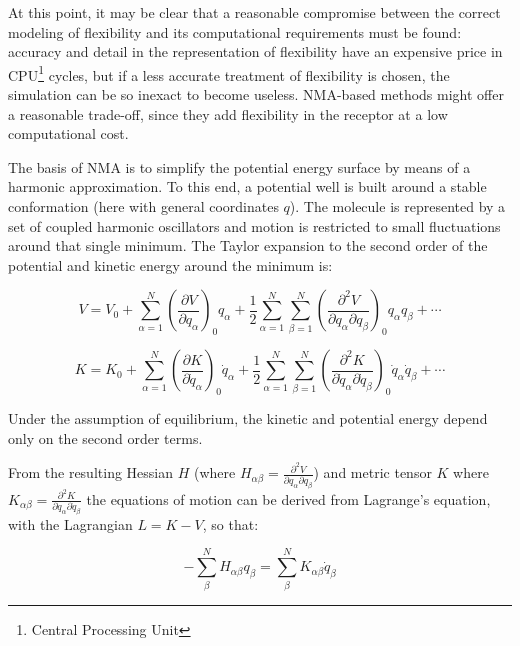 At this point, it may be clear that a reasonable compromise between the correct modeling of flexibility and its computational requirements must be found: accuracy and detail in the representation of flexibility have an expensive price in CPU\footnote{Central Processing Unit} cycles, but if a less accurate treatment of flexibility is chosen, the simulation can be so inexact to become useless. NMA-based methods might offer a reasonable trade-off, since they add flexibility in the receptor at a low computational cost. 

The basis of NMA \cite{goldstein_classical_1950} is to simplify the potential energy surface by means of a harmonic approximation. To this end, a potential well is built around a stable conformation (here with general coordinates $q$). The molecule is represented by a set of coupled harmonic oscillators and motion is restricted to small fluctuations around that single minimum. The Taylor expansion to the second order of the potential and kinetic energy around the minimum is:

\begin{equation}
V = V_0 + \sum^N_{\alpha=1}\left (  \frac{\partial V}{\partial q_\alpha} \right )_0 q_\alpha + \frac{1}{2} \sum^N_{\alpha=1} \sum^N_{\beta=1} \left ( \frac{\partial^2 V}{ \partial q_\alpha \partial q_\beta} \right )_0 q_\alpha q_\beta + \dotsb
\end{equation}

\begin{equation}
K = K_0 + \sum^N_{\alpha=1}\left (  \frac{\partial K}{\partial \dot{q}_\alpha} \right )_0 \dot{q}_\alpha + \frac{1}{2} \sum^N_{\alpha=1} \sum^N_{\beta=1} \left ( \frac{\partial^2 K}{ \partial \dot{q}_\alpha \partial \dot{q}_\beta} \right )_0 \dot{q}_\alpha \dot{q}_\beta + \dotsb
\end{equation}

Under the assumption of equilibrium, the kinetic and potential energy depend only on the second order terms.

From the resulting Hessian $H$ (where $H_{\alpha\beta} = \frac{\partial^2 V}{ \partial q_\alpha \partial q_\beta }$) and metric tensor $K$ where $K_{\alpha\beta} = \frac{ \partial^2 K}{ \partial \dot{q}_\alpha \partial \dot{q}_\beta } $ the equations of motion can be derived from Lagrange's equation, with the Lagrangian $L = ­K - V$, so that:

\begin{equation}
- \sum_{\beta}^N H_{\alpha \beta} q_\beta = \sum_{\beta}^N K_{\alpha \beta}  \dot{q}_\beta
\end{equation}

